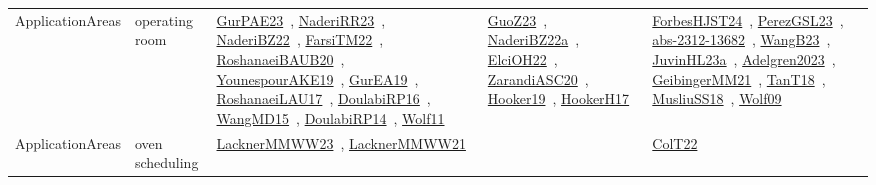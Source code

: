 {\begin{longtable}{lp{3cm}>{\raggedright\arraybackslash}p{6cm}>{\raggedright\arraybackslash}p{6cm}>{\raggedright\arraybackslash}p{8cm}}
ApplicationAreas & operating room & \href{works/GurPAE23.pdf}{GurPAE23}~\cite{GurPAE23}, \href{works/NaderiRR23.pdf}{NaderiRR23}~\cite{NaderiRR23}, \href{works/NaderiBZ22.pdf}{NaderiBZ22}~\cite{NaderiBZ22}, \href{works/FarsiTM22.pdf}{FarsiTM22}~\cite{FarsiTM22}, \href{works/RoshanaeiBAUB20.pdf}{RoshanaeiBAUB20}~\cite{RoshanaeiBAUB20}, \href{works/YounespourAKE19.pdf}{YounespourAKE19}~\cite{YounespourAKE19}, \href{works/GurEA19.pdf}{GurEA19}~\cite{GurEA19}, \href{works/RoshanaeiLAU17.pdf}{RoshanaeiLAU17}~\cite{RoshanaeiLAU17}, \href{works/DoulabiRP16.pdf}{DoulabiRP16}~\cite{DoulabiRP16}, \href{works/WangMD15.pdf}{WangMD15}~\cite{WangMD15}, \href{works/DoulabiRP14.pdf}{DoulabiRP14}~\cite{DoulabiRP14}, \href{works/Wolf11.pdf}{Wolf11}~\cite{Wolf11} & \href{works/GuoZ23.pdf}{GuoZ23}~\cite{GuoZ23}, \href{works/NaderiBZ22a.pdf}{NaderiBZ22a}~\cite{NaderiBZ22a}, \href{works/ElciOH22.pdf}{ElciOH22}~\cite{ElciOH22}, \href{works/ZarandiASC20.pdf}{ZarandiASC20}~\cite{ZarandiASC20}, \href{works/Hooker19.pdf}{Hooker19}~\cite{Hooker19}, \href{works/HookerH17.pdf}{HookerH17}~\cite{HookerH17} & \href{works/ForbesHJST24.pdf}{ForbesHJST24}~\cite{ForbesHJST24}, \href{works/PerezGSL23.pdf}{PerezGSL23}~\cite{PerezGSL23}, \href{works/abs-2312-13682.pdf}{abs-2312-13682}~\cite{abs-2312-13682}, \href{works/WangB23.pdf}{WangB23}~\cite{WangB23}, \href{works/JuvinHL23a.pdf}{JuvinHL23a}~\cite{JuvinHL23a}, \href{works/Adelgren2023.pdf}{Adelgren2023}~\cite{Adelgren2023}, \href{works/GeibingerMM21.pdf}{GeibingerMM21}~\cite{GeibingerMM21}, \href{works/TanT18.pdf}{TanT18}~\cite{TanT18}, \href{works/MusliuSS18.pdf}{MusliuSS18}~\cite{MusliuSS18}, \href{works/Wolf09.pdf}{Wolf09}~\cite{Wolf09}\\
ApplicationAreas & oven scheduling & \href{works/LacknerMMWW23.pdf}{LacknerMMWW23}~\cite{LacknerMMWW23}, \href{works/LacknerMMWW21.pdf}{LacknerMMWW21}~\cite{LacknerMMWW21} &  & \href{works/ColT22.pdf}{ColT22}~\cite{ColT22}\\

\end{longtable}}
